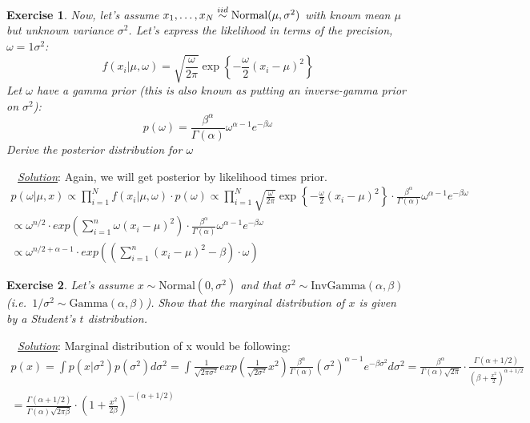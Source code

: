 \documentclass[twoside]{article}
\newcounter{lecnum}
\newtheorem{exercise}{Exercise}[lecnum]
\newenvironment{solution}{
  \begin{flushleft} \noindent ~~\underline{\emph{Solution}}: \rmfamily}{\end{flushleft}}
\begin{document}
\begin{exercise}
  Now, let's assume  $x_1,\dots, x_N \stackrel{\small{iid}}{\sim}\mbox{Normal}(\mu, \sigma^2)$ with known mean $\mu$ but unknown variance $\sigma^2$. Let's express the likelihood in terms of the precision, $\omega=1\sigma^2$:
  $$f(x_i|\mu, \omega) = \sqrt{\frac{\omega}{2\pi}} \exp\left\{-\frac{\omega}{2}(x_i-\mu)^2\right\}$$
  Let $\omega$ have a gamma prior (this is also known as putting an inverse-gamma prior on $\sigma^2$):
  $$p(\omega) = \frac{\beta^\alpha}{\Gamma(\alpha)}\omega^{\alpha-1}e^{-\beta \omega}$$
  Derive the posterior distribution for $\omega$
\end{exercise}

\begin{solution}
Again, we will get posterior by likelihood times prior.
\begin{equation}
\begin{split}
p(\omega | \mu, x) \propto \prod_{i=1}^{N} f(x_i|\mu, \omega)\cdot p(\omega) \propto  \prod_{i=1}^{N}\sqrt{\frac{\omega}{2\pi}} \exp\left\{-\frac{\omega}{2}(x_i-\mu)^2\right\} \cdot \frac{\beta^\alpha}{\Gamma(\alpha)}\omega^{\alpha-1}e^{-\beta \omega} \\ 
\propto \omega^{n/2}\cdot exp({\sum_{i=1}^{n}\omega(x_i-\mu)^2}) \cdot \frac{\beta^\alpha}{\Gamma(\alpha)}\omega^{\alpha-1}e^{-\beta \omega}
\\ \propto \omega^{n/2+\alpha -1} \cdot exp(({\sum_{i=1}^{n}(x_i-\mu)^2} -\beta)\cdot \omega)
\end{split}
\end{equation}
\end{solution}

\begin{exercise}
  Let's assume $x \sim \mbox{Normal}(0, \sigma^2)$ and that $\sigma^2\sim\mbox{InvGamma}(\alpha,\beta)$ (i.e.\ $1/\sigma^2 \sim \mbox{Gamma}(\alpha,\beta)$). Show that the marginal distribution of $x$ is given by a Student's $t$ distribution.
\end{exercise}

\begin{solution}
Marginal distribution of x would be following:
\begin{equation}
\begin{split}
p(x) = \int p(x|\sigma^2) p(\sigma^2) d\sigma^2 = \int \frac{1}{\sqrt{2\pi\sigma^2}}exp(\frac{1}{\sqrt{2\sigma^2}}x^2) \frac{\beta^\alpha}{\Gamma(\alpha)}(\sigma^2)^{\alpha-1}e^{-\beta \sigma^2} d{\sigma^2} = \frac{\beta^{\alpha}}{\Gamma(\alpha)\sqrt{2\pi}}\cdot \frac{\Gamma({\alpha+1/2})}{(\beta+\frac{x^2}{2})^{\alpha+1/2}} \\ = \frac{\Gamma({\alpha+1/2})}{\Gamma(\alpha)\sqrt{2\pi\beta}}\cdot(1+\frac{x^2}{2\beta})^{-(\alpha+1/2)}
\end{split}
\end{equation}

\end{solution}
\end{document}
